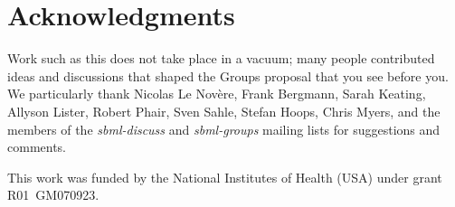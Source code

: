 
\section{Acknowledgments}

Work such as this does not take place in a vacuum; many people contributed ideas and discussions that shaped the Groups proposal that you see before you.  We particularly thank Nicolas Le Nov\`{e}re, Frank Bergmann, Sarah Keating, Allyson Lister, Robert Phair, Sven Sahle, Stefan Hoops, Chris Myers, and the members of the \emph{sbml-discuss} and \emph{sbml-groups} mailing lists for suggestions and comments.


This work was funded by the National Institutes of Health (USA) under grant R01~GM070923.
